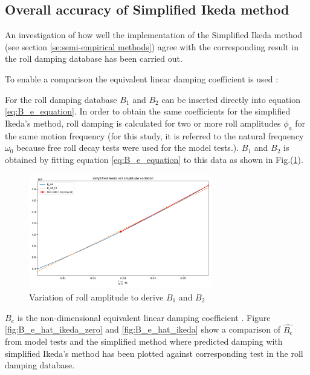 \subsection{Overall accuracy of Simplified Ikeda method}
\label{se:overall_comparison}
An investigation of how well the implementation of the Simplified Ikeda method (see section \ref{se:semi-empirical methods}) agree with the corresponding result in the roll damping database has been carried out. 

To enable a comparison the equivalent linear damping coefficient is used \parencite{himeno_prediction_1981}:


For the roll damping database $B_1$ and $B_2$ can be inserted directly into equation  \ref{eq:B_e_equation}. 
In order to obtain the same coefficients for the simplified Ikeda's method, roll damping is calculated for two or more roll amplitudes $\phi_a$ for the same motion frequency (for this study, it is referred to the natural frequency $\omega_0$ because free roll decay tests were used for the model tests.). $B_1$ and $B_2$ is obtained by fitting equation \ref{eq:B_e_equation} to this data as shown in Fig.(\ref{fig:ikeda_B_1_B2}).  

\begin{figure}[H]
    \centering
    \includegraphics[height=5cm, width=8cm]{figures/ikeda_B_1_B_2.pdf}
    \vspace{-0.5cm}
    \caption{Variation of roll amplitude to derive $B_1$ and $B_2$}
    \label{fig:ikeda_B_1_B2}
\end{figure}

$\hat{B_e}$ is the non-dimensional equivalent linear damping coefficient \parencite{himeno_prediction_1981}.
Figure \ref{fig:B_e_hat_ikeda_zero} and \ref{fig:B_e_hat_ikeda} show a comparison of $\hat{B_e}$ from model tests and the simplified method where predicted damping with simplified Ikeda's method has been plotted against corresponding test in the roll damping database.  

